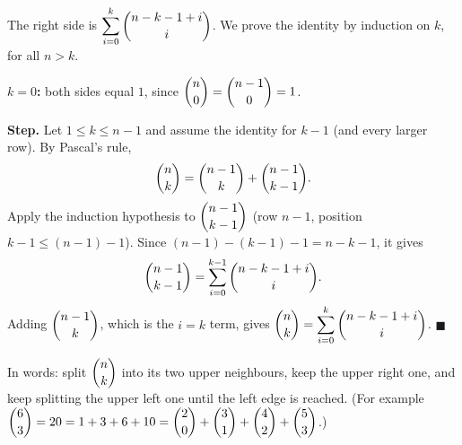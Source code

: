 The right side is $\displaystyle\sum_{i=0}^{k}\dbinom{n-k-1+i}{i}$. We prove the identity by induction on $k$, for all $n>k$.

\textbf{$k=0$:} both sides equal $1$, since $\dbinom n0=\dbinom{n-1}{0}=1$.

\textbf{Step.} Let $1\le k\le n-1$ and assume the identity for $k-1$ (and every larger row). By Pascal's rule,
\[
\dbinom nk=\dbinom{n-1}{k}+\dbinom{n-1}{k-1}.
\]
Apply the induction hypothesis to $\dbinom{n-1}{k-1}$ (row $n-1$, position $k-1\le(n-1)-1$). Since $(n-1)-(k-1)-1=n-k-1$, it gives
\[
\dbinom{n-1}{k-1}=\sum_{i=0}^{k-1}\dbinom{n-k-1+i}{i}.
\]
Adding $\dbinom{n-1}{k}$, which is the $i=k$ term, gives $\dbinom nk=\displaystyle\sum_{i=0}^{k}\dbinom{n-k-1+i}{i}$. $\blacksquare$

In words: split $\dbinom nk$ into its two upper neighbours, keep the upper right one, and keep splitting the upper left one until the left edge is reached. (For example $\dbinom63=20=1+3+6+10=\dbinom20+\dbinom31+\dbinom42+\dbinom53$.)
